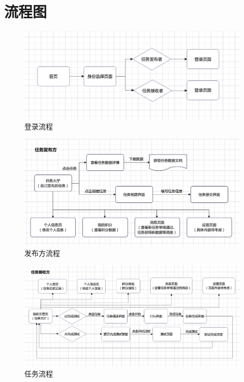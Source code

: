\section{流程图} \label{sec:flow}

\begin{figure}[h!]
    \centering
    \includegraphics[width=\linewidth]{imgs/userflow.png}
    \caption{登录流程}
\end{figure}

\begin{figure}[h!]
    \centering
    \includegraphics[width=\linewidth]{imgs/publish.png}
    \caption{发布方流程}
\end{figure}

\newpage

\begin{figure}[h!]
    \centering
    \includegraphics[width=\linewidth]{imgs/answerflow.png}
    \caption{任务流程}
\end{figure}